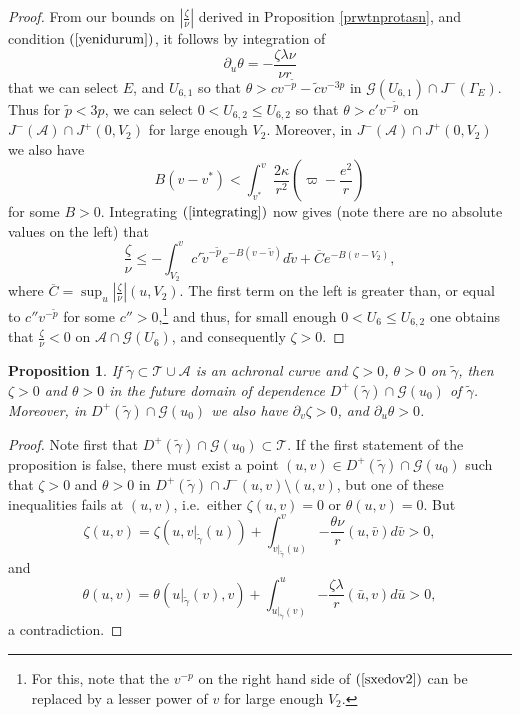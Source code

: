 \documentclass{article}
\newtheorem{proposition}[theorem]{Proposition}
\newcommand{\zn}{\frac{\zeta}{\nu}}
\begin{document}
{\begin{proof}
From our bounds on
$\left|\zn\right|$ derived in Proposition \ref{prwtnprotasn}, 
and condition $(\ref{yenidurum})$,
it follows by integration of
\[
\partial_u\theta=-\frac{\zeta\lambda\nu}{\nu r}
\]
that we can select 
$E$, and $U_{6,1}$
so that $\theta>cv^{-\tilde{p}}-\tilde{c}v^{-3p}$ in
$\mathcal{G}(U_{6,1})\cap J^-(\Gamma_{E})$.
Thus for $\tilde{p}<3p$, we can select $0<U_{6,2}\le U_{6,2}$
so that $\theta>c'v^{-\tilde{p}}$ on 
$J^-(\mathcal{A})\cap J^+(0,V_2)$
for large enough $V_2$.
Moreover, in $J^-(\mathcal{A})\cap J^+(0,V_2)$ we also have
\[
B(v-v^*)<\int_{v^*}^{v}
{\frac{2\kappa}{r^2}\left(\varpi-\frac{e^2}r\right)}
\]
for some $B>0$. Integrating $(\ref{integrating})$ now gives
(note there are no absolute values on the left) that 
\[
\zn\le-\int_{V_2}^v{c'{\tilde{v}}^{-\tilde{p}}
e^{-B(v-\tilde{v})}d\tilde{v}}+\overline{C}e^{-B(v-V_2)},
\]
where $\overline{C}=\sup_u{\left|\zn\right|(u,V_2)}$.
The first term on the left is greater than, or equal
to $c''v^{-\tilde{p}}$ for some $c''>0$,\footnote{For this, note
that the $v^{-p}$ on the right hand side of $(\ref{sxedov2})$ 
can be replaced by
a lesser power of $v$ for large enough $V_2$.} and thus, for small enough 
$0<U_6\le U_{6,2}$
one obtains that $\zn<0$ on $\mathcal{A}\cap\mathcal{G}(U_6)$, and
consequently $\zeta>0$. \end{proof}

\begin{proposition}
\label{fieldmonot}
If $\tilde\gamma\subset\mathcal{T}\cup\mathcal{A}$ is an
achronal curve and
$\zeta>0$, $\theta>0$ on $\tilde\gamma$,
then $\zeta>0$ and $\theta>0$ in
the future domain of dependence $D^+(\tilde\gamma)\cap\mathcal{G}(u_0)$ 
of $\tilde\gamma$. 
Moreover, in $D^+(\tilde\gamma)\cap\mathcal{G}(u_0)$ we also have
$\partial_v\zeta>0$, and $\partial_u\theta>0$.
\end{proposition}

\begin{proof} Note first that 
$D^+(\tilde\gamma)\cap\mathcal{G}(u_0)\subset\mathcal{T}$. 
If the first statement of the
proposition is false, there
must exist a point $(u,v)\in
D^+(\tilde\gamma)\cap\mathcal{G}(u_0)$
such that $\zeta>0$ and $\theta>0$ in 
$D^+(\tilde\gamma)\cap J^-(u,v)\setminus (u,v)$,
but one of these inequalities fails at $(u,v)$, 
i.e.~either $\zeta(u,v)=0$
or $\theta(u,v)=0$.
But
\[
\zeta(u,v)=\zeta(u,v|_{\tilde{\gamma}}(u))
+\int_{v|_{\tilde{\gamma}}(u)}^{v}{-\frac{\theta\nu}r
(u,\bar{v})d\bar{v}}>0,
\]
and
\[
\theta(u,v)=\theta(u|_{\tilde{\gamma}}(v),v)
+\int_{u|_{\tilde{\gamma}}(v)}^u
{-\frac{\zeta\lambda}r(\bar{u},v)d\bar{u}}
>0,
\]
a contradiction. 


\end{proof}}
\end{document}
